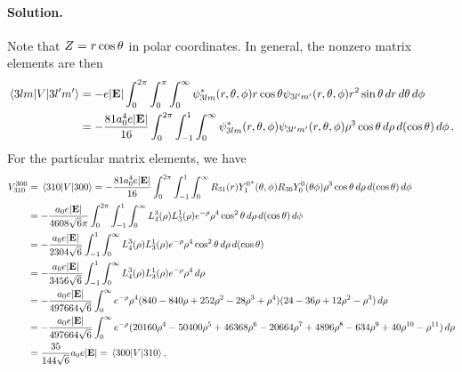 \documentclass[11pt]{article}
\newenvironment{solution}
{
    \paragraph{Solution.}
    \ignorespaces
}
{
}
\begin{document}
\begin{solution}
	Note that $Z = r \cos\theta$ in polar coordinates.  In general, the nonzero matrix elements are then
	\begin{align*}
		\mel{3 l m}{V}{3 l' m'} &= -e |\mathbf{E}| \int_0^{2\pi} \int_0^\pi \int_0^\infty \psi_{3 l m}^*(r, \theta, \phi) r \cos\theta \psi_{3 l' m'}(r, \theta, \phi) r^2 \sin\theta \dd{r} \dd{\theta} \dd{\phi} \\
		&= -\frac{81 a_0^4 e |\mathbf{E}|}{16} \int_0^{2\pi} \int_{-1}^1 \int_0^\infty \psi_{3 l m}^*(r, \theta, \phi) \psi_{3 l' m'}(r, \theta, \phi) \rho^3 \cos\theta \dd{\rho} \dd{(\cos\theta)} \dd{\phi}.
	\end{align*}
	For the particular matrix elements, we have
	\begin{align*}
		V_{3 1 0}^{3 0 0} &= \mel{3 1 0}{V}{3 0 0}
		= -\frac{81 a_0^4 e |\mathbf{E}|}{16} \int_0^{2\pi} \int_{-1}^1 \int_0^\infty R_{31}(r) {Y_1^0}^*(\theta, \phi) R_{3 0} Y_0^0(\theta\phi) \rho^3 \cos\theta \dd{\rho} \dd{(\cos\theta)} \dd{\phi} \\
		&= -\frac{a_0 e |\mathbf{E}|}{4608 \sqrt{6} \pi} \int_0^{2\pi} \int_{-1}^1 \int_0^\infty L_4^3(\rho) L_{3}^{1}(\rho) e^{-\rho} \rho^4 \cos^2\theta \dd{\rho} \dd{(\cos\theta)} \dd{\phi} \\
		&= -\frac{a_0 e |\mathbf{E}|}{2304 \sqrt{6}} \int_{-1}^1 \int_0^\infty L_4^3(\rho) L_{3}^{1}(\rho) e^{-\rho} \rho^4 \cos^2\theta \dd{\rho} \dd{(\cos\theta)} \\
		&= -\frac{a_0 e |\mathbf{E}|}{3456 \sqrt{6}} \int_{-1}^1 \int_0^\infty L_4^3(\rho) L_{3}^{1}(\rho) e^{-\rho} \rho^4 \dd{\rho} \\
		&= -\frac{a_0 e |\mathbf{E}|}{497664 \sqrt{6}} \int_0^\infty e^{-\rho} \rho^4 (840 - 840 \rho + 252 \rho^2 - 28 \rho^3 + \rho^4) (24 - 36 \rho + 12 \rho^2 - \rho^3) \dd{\rho} \\
		&= -\frac{a_0 e |\mathbf{E}|}{497664 \sqrt{6}} \int_0^\infty e^{-\rho} (20160 \rho^4 - 50400 \rho^5 + 46368 \rho^6 - 20664 \rho^7 + 4896 \rho^8 - 634 \rho^9 + 40 \rho^{10} - \rho^{11}) \dd{\rho} \\
		&= \frac{35}{144 \sqrt{6}} a_0 e |\mathbf{E}| = \mel{3 0 0}{V}{3 1 0},
	\end{align*}
	

\end{solution}
\end{document}
